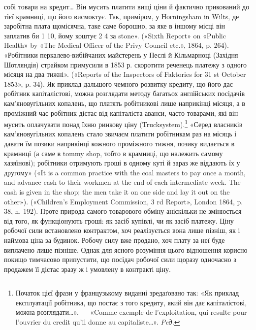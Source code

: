 {собі товари на кредит\dots{} Він мусить платити вищі ціни й фактично
прикований до тієї крамниці, що його висмоктує. Так, приміром, у Ногningsham
in Wilts, де заробітна плата щомісячна, таке саме борошно, за
яке в іншому місці він заплатив би 1 10, йому коштує 2
4 за stone». («Sixth Report» on «Public Health» by «The
Medical Officer of the Privy Council etc.», 1864, p. 264). «Робітники перкалево-вибійчаних
майстерень у Песлі й Кільмарноці (Західня Шотляндія)
страйком примусили в 1853 р. скоротити реченець платежу з одного
місяця на два тижні». («Reports of the Inspectors of Faktories for 31 st
October 1853», p. 34). Як приклад дальшого чемного розвитку кредиту,
що його дає робітник капіталістові, можна розглядати методу багатьох
англійських посідачів кам’яновугільних копалень, що платять робітникові
лише наприкінці місяця, а в проміжний час робітник дістає від капіталіста
аванси, часто товарами, які він мусить оплачувати понад їхню
ринкову ціну (Trucksystem).\footnote*{
Початок цієї фрази у французькому виданні зредаґовано так: «Як
приклад експлуатації робітника, що постає з того кредиту, який він дає
капіталістові, можна розглядати\dots{}». — «Comme exemple de l’exploitation,
qui resulte pour l’ouvrier du credit qu’il donne au capitaliste\dots{}». \emph{Peд.}
}
«Серед власників кам’яновугільних копалень
стало звичаєм платити робітникам раз на місяць і давати їм позики
наприкінці кожного проміжного тижня, позику видається в крамниці
(а саме в tommy shop, тобто в крамниці, що належить самому хазяїнові);
робітники отримують гроші в одному куті й зараз же віддають їх у другому»
(«It is a common practice with the coal masters to pay once a month,
and advance cash to their workmen at the end of each intermediate week.
The cash is given in the shop; the men take it on one side and lay it out on
the other»). («Children’s Employment Commission, 3 rd Report», London
1864, p. 38, n. 192).
}
Проте природа самого товарового
обміну аніскільки не змінюється від того, як функціонують
гроші: як засіб купівлі, чи як засіб платежу. Ціну робочої сили
встановлено контрактом, хоч реалізується вона лише пізніш,
як і наймова ціна за будинок. Робочу силу вже продано, хоч
плату за неї буде виплачено лише пізніше. Однак для ясного розуміння
цього відношення корисно покищо тимчасово припустити,
що посідач робочої сили щоразу одночасно з продажем її дістає
зразу ж і умовлену в контракті ціну.

